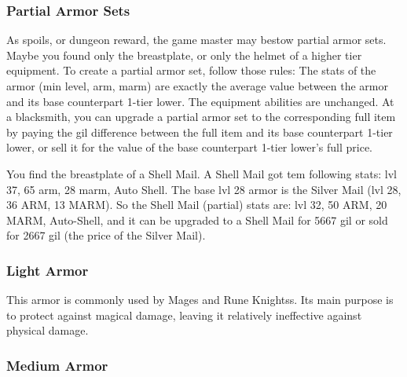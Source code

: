 \begin{multicols}{2}
\subsubsection{Partial Armor Sets}\label{subsec:inv-partial-armor}
As spoils,  or dungeon reward, the game master may bestow partial armor sets. Maybe you found only the breastplate, or only the helmet of a higher tier equipment. To create a partial armor set, follow those rules:
The stats of the armor (min level, arm, marm) are exactly the average value between the armor and its base counterpart 1-tier lower. The equipment abilities are unchanged. At a blacksmith, you can upgrade a partial armor set to the corresponding full item by paying the gil difference between the full item and its base counterpart 1-tier lower, or sell it for the value of the base counterpart 1-tier lower's full price.

\begin{boco}
You find the breastplate of a Shell Mail. A Shell Mail got tem following stats: lvl 37, 65 arm, 28 marm, Auto Shell. The base lvl 28 armor is the Silver Mail (lvl 28, 36 ARM, 13 MARM). So the Shell Mail (partial) stats are: lvl 32, 50 ARM, 20 MARM, Auto-Shell, and it can be upgraded to a Shell Mail for 5667 gil or sold for 2667 gil (the price of the Silver Mail).
\end{boco}

\end{multicols}
\begin{center}
\end{center}
\clearpage

\subsubsection{Light Armor}

This armor is commonly used by Mages and Rune Knightss. Its main purpose is to protect against magical damage, leaving it relatively ineffective against physical damage.

\begin{tabarm}[label=inv-larm]
    
\end{tabarm}

\clearpage
\subsubsection{Medium Armor}

